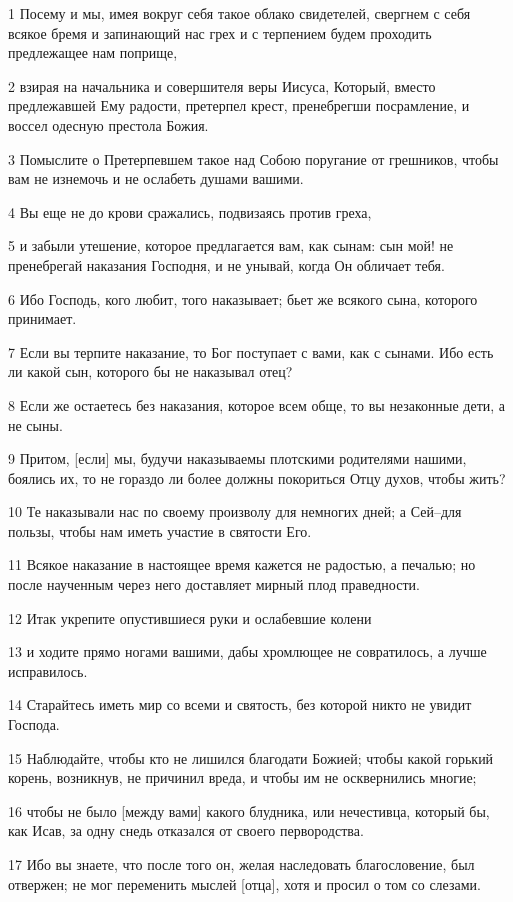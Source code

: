 \par 1 Посему и мы, имея вокруг себя такое облако свидетелей, свергнем с себя всякое бремя и запинающий нас грех и с терпением будем проходить предлежащее нам поприще,
\par 2 взирая на начальника и совершителя веры Иисуса, Который, вместо предлежавшей Ему радости, претерпел крест, пренебрегши посрамление, и воссел одесную престола Божия.
\par 3 Помыслите о Претерпевшем такое над Собою поругание от грешников, чтобы вам не изнемочь и не ослабеть душами вашими.
\par 4 Вы еще не до крови сражались, подвизаясь против греха,
\par 5 и забыли утешение, которое предлагается вам, как сынам: сын мой! не пренебрегай наказания Господня, и не унывай, когда Он обличает тебя.
\par 6 Ибо Господь, кого любит, того наказывает; бьет же всякого сына, которого принимает.
\par 7 Если вы терпите наказание, то Бог поступает с вами, как с сынами. Ибо есть ли какой сын, которого бы не наказывал отец?
\par 8 Если же остаетесь без наказания, которое всем обще, то вы незаконные дети, а не сыны.
\par 9 Притом, [если] мы, будучи наказываемы плотскими родителями нашими, боялись их, то не гораздо ли более должны покориться Отцу духов, чтобы жить?
\par 10 Те наказывали нас по своему произволу для немногих дней; а Сей--для пользы, чтобы нам иметь участие в святости Его.
\par 11 Всякое наказание в настоящее время кажется не радостью, а печалью; но после наученным через него доставляет мирный плод праведности.
\par 12 Итак укрепите опустившиеся руки и ослабевшие колени
\par 13 и ходите прямо ногами вашими, дабы хромлющее не совратилось, а лучше исправилось.
\par 14 Старайтесь иметь мир со всеми и святость, без которой никто не увидит Господа.
\par 15 Наблюдайте, чтобы кто не лишился благодати Божией; чтобы какой горький корень, возникнув, не причинил вреда, и чтобы им не осквернились многие;
\par 16 чтобы не было [между вами] какого блудника, или нечестивца, который бы, как Исав, за одну снедь отказался от своего первородства.
\par 17 Ибо вы знаете, что после того он, желая наследовать благословение, был отвержен; не мог переменить мыслей [отца], хотя и просил о том со слезами.
